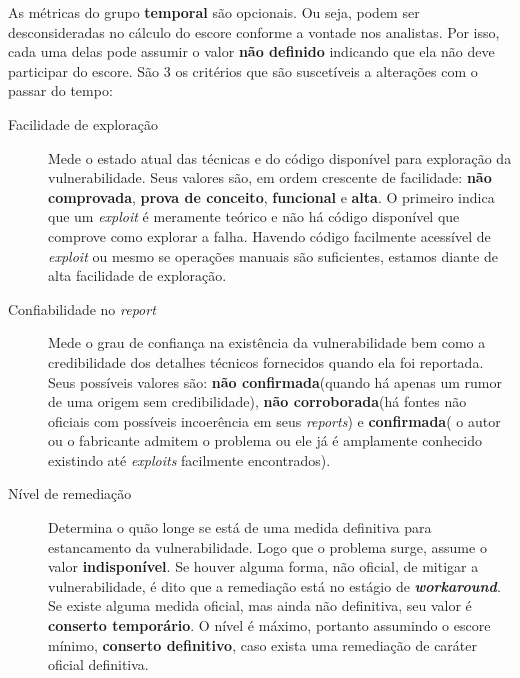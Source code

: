 			As métricas do grupo \textbf{temporal} são opcionais. Ou seja, podem ser
			desconsideradas no cálculo do escore conforme a vontade nos analistas.
			Por isso, cada uma delas pode assumir o valor \textbf{não definido} indicando
			que ela não deve participar do escore.
			São 3 os critérios que são suscetíveis a alterações com o passar do tempo:
			\begin{description}
				\item[Facilidade de exploração]{Mede o estado atual das técnicas
					e do código disponível para exploração da vulnerabilidade.
					Seus valores são, em ordem crescente de facilidade: 
					\textbf{não comprovada},  \textbf{prova de conceito},
					\textbf{funcional} e \textbf{alta}.
					O primeiro indica que um \textsl{exploit} é meramente teórico
					e não há código disponível que comprove como explorar a falha.
					Havendo código facilmente acessível de \textsl{exploit}
					ou mesmo se operações manuais são suficientes, estamos
					diante de alta facilidade de exploração.}
				\item[Confiabilidade no \textsl{report}]{
					Mede o grau de confiança na existência da vulnerabilidade
					bem como a credibilidade dos detalhes técnicos fornecidos
					quando ela foi reportada. Seus possíveis valores são:
					\textbf{não confirmada}(quando há apenas um rumor de uma origem
					sem credibilidade), \textbf{não corroborada}(há fontes não oficiais
					com possíveis incoerência em seus \textsl{reports}) e \textbf{confirmada}(
					o autor ou o fabricante admitem o problema ou ele já é amplamente
					conhecido existindo até \textsl{exploits} facilmente encontrados).
					}
				\item[Nível de remediação]{Determina o quão longe se está de uma medida
					definitiva para estancamento da vulnerabilidade.
					Logo que o problema surge, assume o valor \textbf{indisponível}.
					Se houver alguma forma, não oficial, de mitigar a vulnerabilidade,
					é dito que a remediação está no estágio de 	\textbf{\textsl{workaround}}.
					Se existe alguma medida oficial, mas ainda não definitiva, 
					seu valor é \textbf{conserto temporário}. O nível é máximo,
					portanto assumindo o escore mínimo,
					\textbf{conserto definitivo}, caso exista uma remediação de caráter
					oficial definitiva.}
			\end{description}



